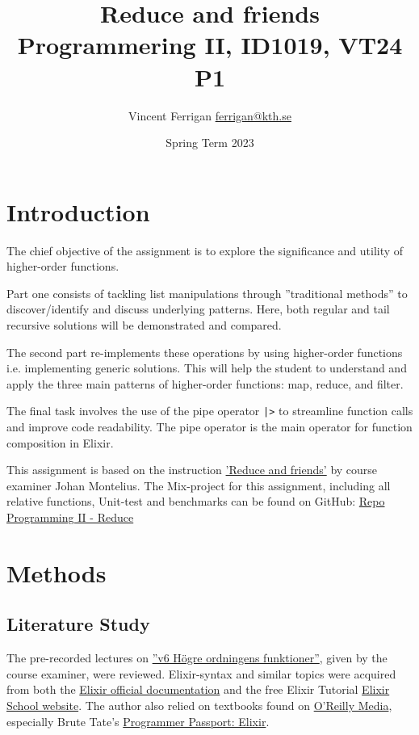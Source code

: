 \documentclass[a4paper,11pt]{article}
\begin{document}
\title{
    Reduce and friends
\\\small{Programmering II, ID1019, VT24 P1}
}
\author{Vincent Ferrigan \href{mailto:ferrigan@kth.se}{ferrigan@kth.se}}

\date{Spring Term 2023}

\maketitle

\section*{Introduction}
\label{sec:introduction}
The chief objective of the assignment is to explore the significance and utility
of higher-order functions.

Part one consists of tackling list manipulations through
''traditional methods'' to discover/identify and discuss underlying patterns.
Here, both regular and tail recursive solutions will be demonstrated and compared.

The second part re-implements these operations by using higher-order functions
i.e. implementing generic solutions.
This will help the student to understand and apply the three main patterns of
higher-order functions: map, reduce, and filter.

The final task involves the use of the pipe operator \texttt{|>}
to streamline
function calls and improve code readability.
The pipe operator is the main operator for function composition in Elixir.

This assignment is based on the instruction
\href{https://people.kth.se/~johanmon/courses/id1019/seminars/reduce/reduce.pdf}{'Reduce and friends'}
by course examiner Johan Montelius.
The Mix-project for this assignment, including all relative functions, Unit-test and benchmarks can be found on GitHub:
\href{https://github.com/VincentFerrigan/kth-id1019-programming-ii/tree/main/tasks/4/reduce}{Repo Programming II - Reduce}%

\section*{Methods}
\label{sec:methods}
\subsection*{Literature Study}
\label{subsec:literaturestudy}
The pre-recorded lectures on
\href{https://canvas.kth.se/courses/44911/assignments/syllabus}{''v6 Högre ordningens funktioner''},
given by the course examiner, were reviewed.
Elixir-syntax and similar topics were acquired
from both the
\href{https://elixir-lang.org/docs.html}{Elixir official documentation}
and the free Elixir Tutorial
\href{https://elixirschool.com/en}{Elixir School
website}.
The author also relied on textbooks found on
\href{https://learning.oreilly.com}{O'Reilly Media},
especially Brute Tate's
\href{https://learning.oreilly.com/library/view/programmer-passport-elixir/9781680509649/}{Programmer Passport: Elixir}.
\end{document}

